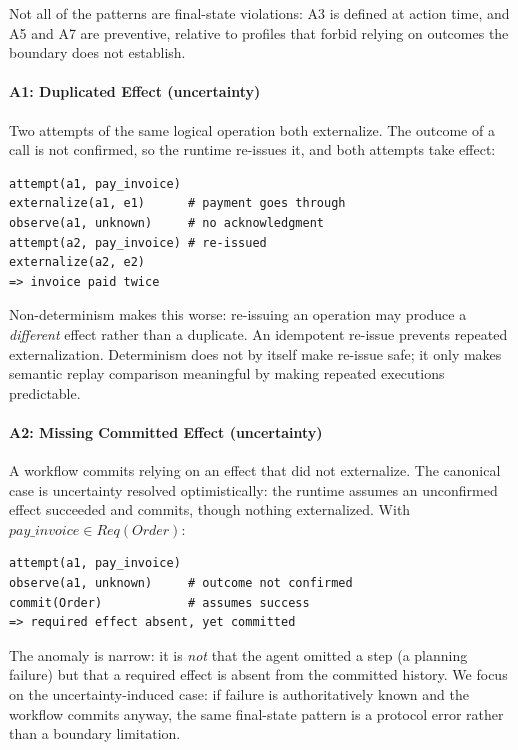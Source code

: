 \documentclass[runningheads]{comsis3}
\begin{document}
Not all of the patterns are final-state violations: A3 is defined at
action time, and A5 and A7 are preventive, relative to profiles that forbid
relying on outcomes the boundary does not establish.

\paragraph{A1: Duplicated Effect (uncertainty)}
Two attempts of the same logical operation both externalize. The
outcome of a call is not confirmed, so the runtime re-issues it, and both
attempts take effect:
\par\medskip\noindent\begin{minipage}{\linewidth}
\begingroup\small\begin{verbatim}
attempt(a1, pay_invoice)
externalize(a1, e1)      # payment goes through
observe(a1, unknown)     # no acknowledgment
attempt(a2, pay_invoice) # re-issued
externalize(a2, e2)
=> invoice paid twice
\end{verbatim}\endgroup
\end{minipage}\par\medskip\noindent
Non-determinism makes this worse: re-issuing an operation may produce a
\emph{different} effect rather than a duplicate. An idempotent re-issue
prevents repeated externalization. Determinism does not by itself make
re-issue safe; it only makes semantic replay comparison meaningful by
making repeated executions predictable.

\paragraph{A2: Missing Committed Effect (uncertainty)}
A workflow commits relying on an effect that did not externalize.
The canonical case is uncertainty resolved optimistically: the runtime
assumes an unconfirmed effect succeeded and commits, though nothing
externalized. With $pay\_invoice \in Req(Order)$:
\par\medskip\noindent\begin{minipage}{\linewidth}
\begingroup\small\begin{verbatim}
attempt(a1, pay_invoice)
observe(a1, unknown)     # outcome not confirmed
commit(Order)            # assumes success
=> required effect absent, yet committed
\end{verbatim}\endgroup
\end{minipage}\par\medskip\noindent
The anomaly is narrow: it is \emph{not} that the agent omitted a step (a planning failure) but that a required effect is absent from the
committed history. We focus on the uncertainty-induced case: if failure is
authoritatively known and the workflow commits anyway, the same final-state
pattern is a protocol error rather than a boundary limitation.
\end{document}
